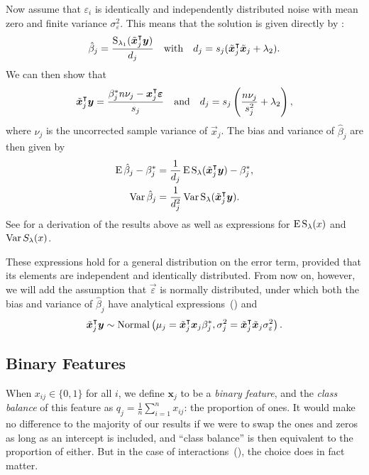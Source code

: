 Now assume that \(\varepsilon_i\) is identically and independently distributed noise with
mean zero and finite variance \(\sigma_\varepsilon^2\). This means that the solution is
given directly by :
\[
  \hat{\beta}_j = \frac{\operatorname{S}_{\lambda_1}(\tilde{\boldsymbol{x}}_j^\intercal \boldsymbol{y})}{d_j}\quad\text{with}\quad d_j = s_j(\tilde{\boldsymbol{x}}_j^\intercal \tilde{\boldsymbol{x}}_j + \lambda_2).
\]
We can then show that
\begin{equation}
  \label{eq:z-d}
  \tilde{\boldsymbol{x}}_j^\intercal \boldsymbol{y} = \frac{\beta_j^* n \nu_j- \boldsymbol{x}_j^\intercal \boldsymbol{\varepsilon}}{s_j}
  \quad\text{and}\quad
  d_j = s_j\left(\frac{n \nu_j}{s_j^2} + \lambda_2\right),
\end{equation}
where \(\nu_j\) is the uncorrected sample variance of \(\vec{x}_j\).
The bias and variance of \(\hat{\beta}_j\) are then given by
\begin{align}
  \operatorname{E} \hat\beta_j - \beta_j^* & = \frac{1}{d_j}\operatorname{E} \operatorname{S}_\lambda(\tilde{\boldsymbol{x}}_j^\intercal \boldsymbol{y}) - \beta^*_j,\label{eq:bias} \\
  \operatorname{Var} \hat\beta_j           & = \frac{1}{d_j^2} \operatorname{Var} \operatorname{S}_\lambda(\tilde{\boldsymbol{x}}_j^\intercal \boldsymbol{y}).\label{eq:variance}
\end{align}
See  for a derivation of the results above
as well as expressions for \(\operatorname{E} \operatorname{S}_\lambda(x)\) and \(\operatorname{Var} S_\lambda(x)\).

These expressions hold for a general distribution on the error term, provided that its
elements are independent and identically distributed. From now on, however, we will add the
assumption that \(\vec{\varepsilon}\) is normally distributed, under which both the bias
and variance of \(\hat{\beta}_j\) have analytical
expressions~() and
\[
  \tilde{\boldsymbol{x}}_j^\intercal \boldsymbol{y} \sim \operatorname{Normal}\left(\mu_j = \tilde{\boldsymbol{x}}_j^\intercal\boldsymbol{x}_j \beta_j^*, \sigma_j^2 = \tilde{\boldsymbol{x}}_j^\intercal\tilde{\boldsymbol{x}}_j \sigma_\varepsilon^2 \right).
\]

\subsection{Binary Features}%
\label{sec:theory-binary-features}

When \(x_{ij} \in \{0, 1\}\) for all \(i\), we define \(\bm{x}_j\) to be a \emph{binary
  feature}, and the \emph{class balance} of this feature as \(q_j =
\frac{1}{n}\sum_{i=1}^n{x_{ij}}\): the proportion of ones. It would make no difference to
the majority of our results if we were to swap the ones and zeros as long as an intercept
is included, and ``class balance'' is then equivalent to the proportion of either. But in
the case of interactions~(), the choice does in fact matter.


